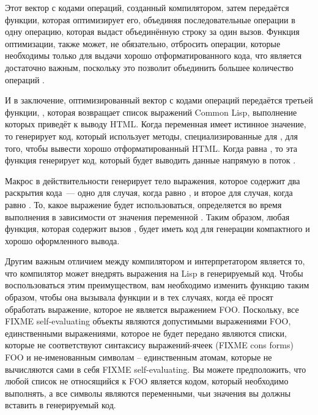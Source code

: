 Этот вектор с кодами операций, созданный компилятором, затем передаётся функции, которая
оптимизирует его, объединяя последовательные операции  в одну операцию,
которая выдаст объединённую строку за один вызов. Функция оптимизации, также может, не
обязательно, отбросить операции, которые необходимы только для выдачи хорошо
отформатированного кода, что является достаточно важным, поскольку это позволит объединить
большее количество операций .

И в заключение, оптимизированный вектор с кодами операций передаётся третьей функции,
, которая возвращает список выражений Common Lisp, выполнение которых
приведёт к выводу HTML.  Когда переменная  имеет истинное значение, то
 генерирует код, который использует методы, специализированные для
, для того, чтобы вывести хорошо отформатированный HTML. Когда
 равна , то эта функция генерирует код, который будет выводить
данные напрямую в поток .

Макрос  в действительности генерирует тело выражения, которое содержит два
раскрытия кода~--- одно для случая, когда  равно , и второе для
случая, когда  равно .  То, какое выражение будет использоваться,
определяется во время выполнения в зависимости от значения переменной .
Таким образом, любая функция, которая содержит вызов , будет иметь код для
генерации компактного и хорошо оформленного вывода.

Другим важным отличием между компилятором и интерпретатором является то, что компилятор
может внедрять выражения на Lisp в генерируемый код.  Чтобы воспользоваться этим
преимуществом, вам необходимо изменить функцию  таким образом, чтобы она
вызывала функции  и  в тех случаях, когда её просят
обработать выражение, которое не является выражением FOO. Поскольку, все FIXME
self-evaluating объекты являются допустимыми выражениями FOO, единственными выражениями,
которое не будет передано  являются списки, которые не
соответствуют синтаксису выражений-ячеек (FIXME cons forms) FOO и не-именованным символам
-- единственным атомам, которые не вычисляются сами в себя FIXME self-evaluating.  Вы
можете предположить, что любой список не относящийся к FOO является кодом, который
необходимо выполнять, а все символы являются переменными, чьи значения вы должны вставить
в генерируемый код.

